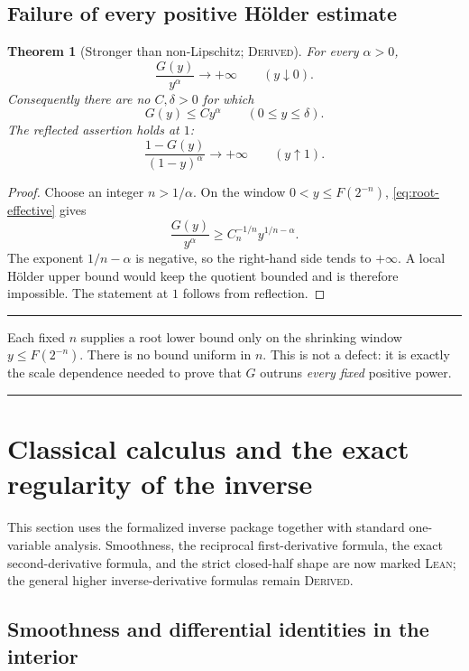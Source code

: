 \documentclass[11pt,oneside]{article}
\newtheorem{theorem}{Theorem}[section]
\theoremstyle{definition}
\theoremstyle{remark}
\newenvironment{boxedremark}{%
  \par\smallskip\noindent\begin{center}\begin{minipage}{0.94\textwidth}%
  \color{black}\hrule\vspace{0.6em}\small
}{%
  \vspace{0.6em}\hrule\end{minipage}\end{center}\smallskip
}
\newcommand{\InvF}{G}
\newcommand{\Formalized}{\textsc{Lean}}
\newcommand{\Derived}{\textsc{Derived}}
\begin{document}
\subsection{Failure of every positive Hölder estimate}

\begin{theorem}[Stronger than non-Lipschitz; \Derived]
\label{thm:no-holder}
For every $\alpha>0$,
\[
 \frac{\InvF(y)}{y^\alpha}\longrightarrow+\infty
 \qquad (y\downarrow0).
\]
Consequently there are no $C,\delta>0$ for which
\[
 \InvF(y)\leq Cy^\alpha\qquad(0\leq y\leq\delta).
\]
The reflected assertion holds at $1$:
\[
 \frac{1-\InvF(y)}{(1-y)^\alpha}\longrightarrow+\infty
 \qquad (y\uparrow1).
\]
\end{theorem}

\begin{proof}
Choose an integer $n>1/\alpha$.  On the window
$0<y\leq F(2^{-n})$, \cref{eq:root-effective} gives
\[
 \frac{\InvF(y)}{y^\alpha}
 \geq C_n^{-1/n}y^{1/n-\alpha}.
\]
The exponent $1/n-\alpha$ is negative, so the right-hand side tends to
$+\infty$.  A local Hölder upper bound would keep the quotient bounded and
is therefore impossible.  The statement at $1$ follows from reflection.
\end{proof}

\begin{boxedremark}
Each fixed $n$ supplies a root lower bound only on the shrinking window
$y\leq F(2^{-n})$.  There is no bound uniform in $n$.  This is not a
defect: it is exactly the scale dependence needed to prove that
$\InvF$ outruns \emph{every fixed} positive power.
\end{boxedremark}


\section{Classical calculus and the exact regularity of the inverse}
\label{sec:inverse-calculus}

This section uses the formalized inverse package together with standard
one-variable analysis.  Smoothness, the reciprocal first-derivative formula,
the exact second-derivative formula, and the strict closed-half shape are now
marked \Formalized; the general higher inverse-derivative formulas remain
\Derived.

\subsection{Smoothness and differential identities in the interior}
\end{document}
